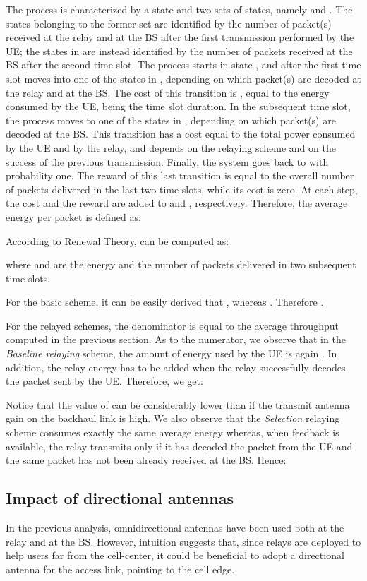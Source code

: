 \documentclass[12pt, letterpaper, onecolumn, draftcls]{IEEEtran}
\begin{document}
The process  is characterized by a state  and two sets of states, namely  and . The states belonging to the former set are identified by the number of packet(s) received at the relay and at the BS after the first transmission performed by the UE; the states in  are instead identified by the number of packets received at the BS after the second time slot.
The process starts in state , and after the first time slot moves into one of the states in , depending on which packet(s) are decoded at the relay and at the BS. The cost of this transition is , equal to the energy consumed by the UE, being  the time slot duration.
In the subsequent time slot, the process moves to one of the states in , depending on which packet(s) are decoded at the BS. This transition has a cost equal to the total power consumed by the UE and by the relay, and depends on the relaying scheme and on the success of the previous transmission.
Finally, the system goes back to  with probability one. The reward of this last transition is equal to the overall number of packets  delivered in the last two time slots, while its cost is zero.
At each step, the cost and the reward are added to  and , respectively.
Therefore, the average energy per packet  is defined as:


According to Renewal Theory,  can be computed as:

where  and  are the energy and the number of packets delivered in two subsequent time slots.

For the basic scheme, it can be easily derived that , whereas . Therefore .

For the relayed schemes, the denominator is equal to the average throughput computed in the previous section. As to the numerator, we observe that in the \textit{Baseline relaying} scheme, the amount of energy used by the UE is again . In addition, the relay energy  has to be added when the relay successfully decodes the packet sent by the UE. Therefore, we get:

Notice that the value of  can be considerably lower than  if the transmit antenna gain  on the backhaul link is high. We also observe that the \textit{Selection} relaying scheme consumes exactly the same average energy whereas, when feedback is available, the relay transmits only if it has decoded the packet from the UE and the same packet has not been already received at the BS. Hence:



\subsection{Impact of directional antennas}
In the previous analysis, omnidirectional antennas have been used both at the relay and at the BS. However, intuition suggests that, since relays are deployed to help users far from the cell-center, it could be beneficial to adopt a directional antenna for the access link, pointing to the cell edge.
\end{document}
